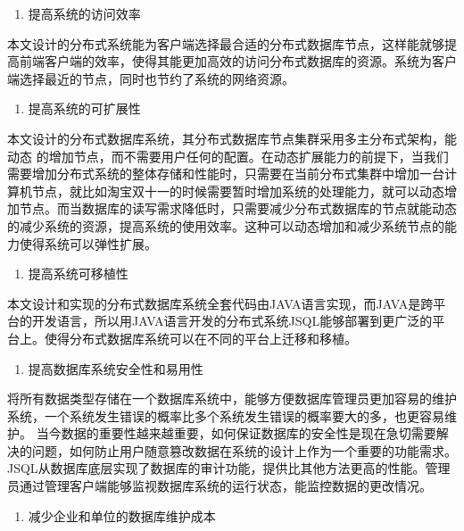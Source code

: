 	\begin{enumerate}[resume]
		\item 提高系统的访问效率
	\end{enumerate}

	本文设计的分布式系统能为客户端选择最合适的分布式数据库节点，这样能就够提高前端客户端的效率，使得其能更加高效的访问分布式数据库的资源。系统为客户端选择最近的节点，同时也节约了系统的网络资源。
	
	\begin{enumerate}[resume]
		\item 提高系统的可扩展性
	\end{enumerate}

	本文设计的分布式数据库系统，其分布式数据库节点集群采用多主分布式架构，能动态
	的增加节点，而不需要用户任何的配置。在动态扩展能力的前提下，当我们需要增加分布式系统的整体存储和性能时，只需要在当前分布式集群中增加一台计算机节点，就比如淘宝双十一的时候需要暂时增加系统的处理能力，就可以动态增加节点。而当数据库的读写需求降低时，只需要减少分布式数据库的节点就能动态的减少系统的资源，提高系统的使用效率。这种可以动态增加和减少系统节点的能力使得系统可以弹性扩展。
	
	\begin{enumerate}[resume]
		\item 提高系统可移植性
	\end{enumerate}

	本文设计和实现的分布式数据库系统全套代码由JAVA语言实现，而JAVA是跨平台的开发语言，所以用JAVA语言开发的分布式系统JSQL能够部署到更广泛的平台上。使得分布式数据库系统可以在不同的平台上迁移和移植。
	
	\begin{enumerate}[resume]
		\item 提高数据库系统安全性和易用性
	\end{enumerate}

将所有数据类型存储在一个数据库系统中，能够方便数据库管理员更加容易的维护系统，一个系统发生错误的概率比多个系统发生错误的概率要大的多，也更容易维护。
	当今数据的重要性越来越重要，如何保证数据库的安全性是现在急切需要解决的问题，如何防止用户随意篡改数据在系统的设计上作为一个重要的功能需求。JSQL从数据库底层实现了数据库的审计功能，提供比其他方法更高的性能。管理员通过管理客户端能够监视数据库系统的运行状态，能监控数据的更改情况。
	
		\begin{enumerate}[resume]
		\item 减少企业和单位的数据库维护成本
	\end{enumerate}
	
